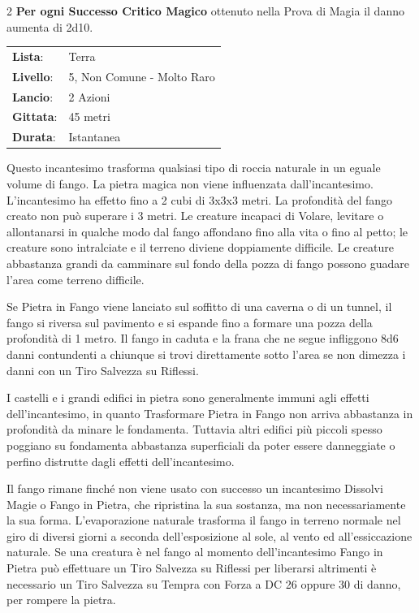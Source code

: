 \begin{multicols}{2}
\textbf{Per ogni Successo Critico Magico} ottenuto nella Prova di Magia il danno aumenta di 2d10.


\noindent\begin{tabularx}{\linewidth}{p{1.9cm}X}
	\rowcolor{gray!20}\textbf{Lista}: & Terra \\
	\textbf{Livello}: & 5, Non Comune - Molto Raro \\
	\rowcolor{gray!20}\textbf{Lancio}: & 2 Azioni \\
	\textbf{Gittata}: & 45 metri \\
	\rowcolor{gray!20}\textbf{Durata}: & Istantanea \\
\end{tabularx}\smallskip


Questo incantesimo trasforma qualsiasi tipo di roccia naturale in un eguale volume di fango. La pietra magica non viene influenzata dall'incantesimo. L'incantesimo ha effetto fino a 2 cubi di 3x3x3 metri. La profondità del fango creato non può superare i 3 metri. Le creature incapaci di Volare, levitare o allontanarsi in qualche modo dal fango affondano fino alla vita o fino al petto; le creature sono intralciate e il terreno diviene doppiamente difficile. Le creature abbastanza grandi da camminare sul fondo della pozza di fango possono guadare l'area come terreno difficile.

Se Pietra in Fango viene lanciato sul soffitto di una caverna o di un tunnel, il fango si riversa sul pavimento e si espande fino a formare una pozza della profondità di 1 metro. Il fango in caduta e la frana che ne segue infliggono 8d6 danni contundenti a chiunque si trovi direttamente sotto l'area se non dimezza i danni con un Tiro Salvezza su Riflessi.

I castelli e i grandi edifici in pietra sono generalmente immuni agli effetti dell'incantesimo, in quanto Trasformare Pietra in Fango non arriva abbastanza in profondità da minare le fondamenta. Tuttavia altri edifici più piccoli spesso poggiano su fondamenta abbastanza superficiali da poter essere danneggiate o perfino distrutte dagli effetti dell'incantesimo.

Il fango rimane finché non viene usato con successo un incantesimo Dissolvi Magie o Fango in Pietra, che ripristina la sua sostanza, ma non necessariamente la sua forma. L'evaporazione naturale trasforma il fango in terreno normale nel giro di diversi giorni a seconda dell'esposizione al sole, al vento ed all'essiccazione naturale.
Se una creatura è nel fango al momento dell'incantesimo Fango in Pietra può effettuare un Tiro Salvezza su Riflessi per liberarsi altrimenti è necessario un Tiro Salvezza su Tempra con Forza a DC 26 oppure 30 di danno, per rompere la pietra.


\end{multicols}
